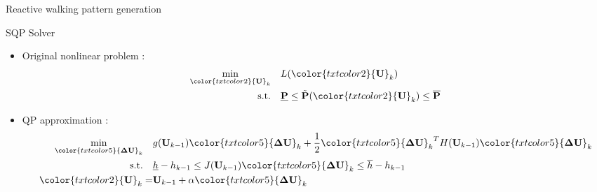 \begin{frame}{Reactive walking pattern generation }
\end{frame}



\begin{frame}{SQP Solver}

\begin{itemize}
\item Original nonlinear problem :
  \begin{align*}
    \min_{\color{txtcolor2}{\bf U}_k}  \quad & L({\color{txtcolor2}{\bf U}_k}) \\
    \text{s.t.} \quad & \underline{\bf P} \leq \tilde{\bf P}({\color{txtcolor2}{\bf U}_k}) \leq \overline{\bf P}
  \end{align*}
\item QP approximation :
  \begin{align*}
    \min_{{\color{txtcolor5}{\bf \Delta U}_k}} \quad &
    g({\bf U}_{k-1}) {\color{txtcolor5}{\bf \Delta U}_k} +
    \frac{1}{2} {\color{txtcolor5}{\bf \Delta U}_k}^T H({\bf U}_{k-1}) {\color{txtcolor5}{\bf \Delta U}_k} \\
    \text{s.t.} \quad & \underline{h} - h_{k-1} \leq J({\bf U}_{k-1}) {\color{txtcolor5}{\bf \Delta U}_k} \leq \overline{h} - h_{k-1}\\
    {\color{txtcolor2}{\bf U}_k} =& {\bf U}_{k-1} + \alpha {\color{txtcolor5}{\bf \Delta U}_k}
  \end{align*}
\end{itemize}
\end{frame}


